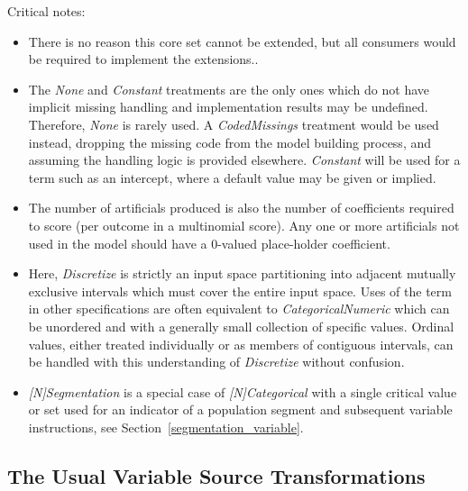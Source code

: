 \documentclass[10pt]{article}
\begin{document}
\noindent
\tallstrut Critical notes:
\begin{itemize}
\item There is no reason this core set cannot be extended, but all consumers would be required to implement the extensions..
\item The {\em None} and {\em Constant} treatments are the only ones which do not have implicit missing handling and implementation
    results may be undefined.  Therefore, {\em None} is rarely used.  A {\em CodedMissings} treatment would be used instead, dropping the 
        missing code from the model building process, and assuming the handling logic is provided elsewhere. 
        {\em Constant} will be used for a term such as an intercept, where a default value may be given or implied.
    \item The number of artificials produced is also the number of coefficients required to score (per outcome in a multinomial score).  Any one 
or more artificials not used in the model should have a 0-valued place-holder coefficient.
\item Here, {\em Discretize} is strictly an input space partitioning into adjacent mutually exclusive intervals which must 
    cover the entire input space.  Uses of the term in other specifications are often equivalent to {\em CategoricalNumeric} which
    can be unordered and with a generally small collection of specific values.   Ordinal values, either treated 
    individually or as members of contiguous intervals, can be handled with this understanding of {\em Discretize} without confusion.
\item {\em [N]Segmentation} is a special case of 
    {\em [N]Categorical} with a single critical value or set used for an indicator of a population segment and subsequent 
        variable instructions, see Section~\ref{segmentation_variable}.
\end{itemize}


\subsection{The Usual Variable Source Transformations\label{variable_source_transformations}}
\end{document}
